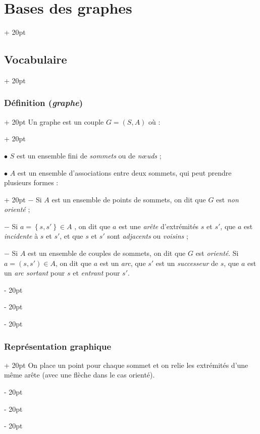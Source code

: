 \documentclass[a4paper, 12pt, twoside]{article}
\newcommand{\set}[1]{\left\{ #1 \right\}}
\newcommand{\ind}[1][20pt]{\advance\leftskip + #1}
\newcommand{\deind}[1][20pt]{\advance\leftskip - #1}
\newenvironment{indt}[2][20pt]{#2 \par \ind[#1]}{\par \deind} %
\begin{document}
    \begin{indt}{\section{Bases des graphes}}
        \begin{indt}{\subsection{Vocabulaire}}
            \begin{indt}{\subsubsection{Définition (\textit{graphe})}}
                \begin{indt}{Un graphe est un couple $G = (S, A)$ où :}
                    \label{2.1.1}

                    $\bullet$ $S$ est un ensemble fini de \textit{sommets} ou de \textit{n\oe uds} ;

                    \begin{indt}{$\bullet$ $A$ est un ensemble d'associations entre deux sommets, qui peut prendre plusieurs formes :}
                        $-$ Si $A$ est un ensemble de points de sommets, on dit que $G$ est \textit{non orienté} ;

                        $-$ Si $a = \set{s, s'} \in A$ , on dit que $a$ est une \textit{arête} d'extrémités $s$ et $s'$, que $a$ est \textit{incidente} à $s$ et $s'$, et que $s$ et $s'$ sont \textit{adjacents} ou \textit{voisins} ;

                        $-$ Si $A$ est un ensemble de couples de sommets, on dit que $G$ est \textit{orienté}.
                        \newline
                        Si $a = (s, s') \in A$, on dit que $a$ est un \textit{arc}, que $s'$ est un \textit{successeur} de $s$, que $a$ est un \textit{arc sortant} pour $s$ et \textit{entrant} pour $s'$.
                    \end{indt}
                \end{indt}
            \end{indt}

            \vspace{12pt}
            
            \begin{indt}{\subsubsection{Représentation graphique}}
                On place un point pour chaque sommet et on relie les extrémités d'une même arête (avec une flèche dans le cas orienté).


\end{indt}
\end{indt}
\end{indt}
\end{document}

